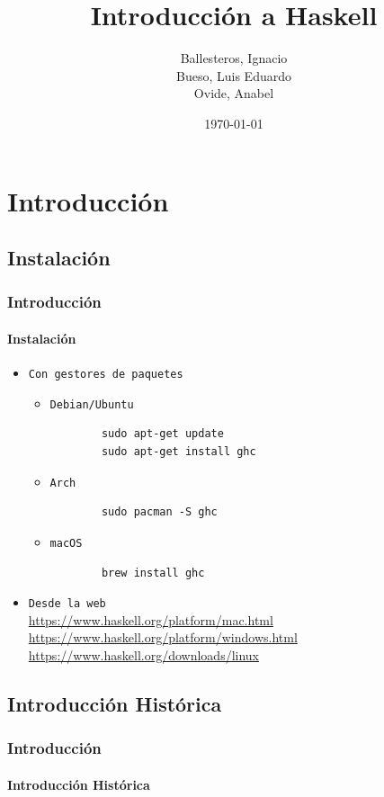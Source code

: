 \documentclass{beamer}
\title{Introducción a Haskell}
\subtitle{}
\date{\today}
\author{Ballesteros, Ignacio\\Bueso, Luis Eduardo\\Ovide, Anabel}
\institute{\url{https://github.com/edububa/haskell_course}}
\begin{document}
\maketitle



\section{Introducción}
\subsection{Instalación}
\begin{frame}[fragile]
  \frametitle{Introducción}
  \framesubtitle{Instalación}
  \begin{itemize}
  \item\texttt{Con gestores de paquetes}
    \begin{itemize}
    \item\texttt{Debian/Ubuntu}
      \begin{verbatim}
        sudo apt-get update
        sudo apt-get install ghc
      \end{verbatim}
    \item\texttt{Arch}
      \begin{verbatim}
        sudo pacman -S ghc
      \end{verbatim}
    \item\texttt{macOS}
      \begin{verbatim}
        brew install ghc
      \end{verbatim}
    \end{itemize}
  \item\texttt{Desde la web}\\
    \url{https://www.haskell.org/platform/mac.html}\\
    \url{https://www.haskell.org/platform/windows.html}\\
    \url{https://www.haskell.org/downloads/linux}
  \end{itemize}
\end{frame}

\subsection{Introducción Histórica}
\begin{frame}[fragile]          %
  \frametitle{Introducción}
  \framesubtitle{Introducción Histórica}

\end{frame}
\end{document}
